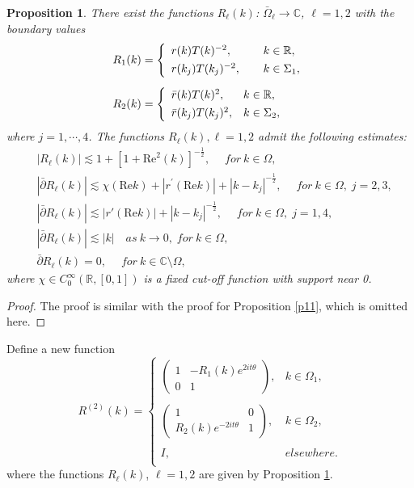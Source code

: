 \documentclass[11pt]{article}
\numberwithin{equation}{section}
\newtheorem{Proposition}{Proposition}
\begin{document}
\begin{Proposition}\label{p22}
There exist  the functions $R_{\ell}(k)$: $\bar{\Omega}_{\ell}\to \mathbb{C}$, $\ell=1,2$  with the boundary values
	\begin{align} &R_{1}(k)=\left\{\begin{array}{ll}
	r(k)T(k)^{-2}, &\hspace{0.4cm}k\in \mathbb{R},\\[4pt]
 r(k_j)T(k_j)^{-2} ,  &\hspace{0.4cm}k\in \Sigma_{1},\\
	\end{array}\right. \\[5pt]
	&R_{2}(k)=\left\{\begin{array}{ll} \bar{r}(k)T(k)^{2},
 &k\in  \mathbb{R},\\[4pt] \bar{r}(k_j)T(k_j)^{2}, &k\in \Sigma_{2},
	\end{array} \right.
	\end{align}	
where $j=1,\cdots, 4$.
The functions  $R_{\ell}(k), \ell=1,2$  admit the following estimates:
	\begin{align*}
    &|R_{\ell}(k)|\lesssim 1+\left[1+\mathrm{Re}^2(k)\right]^{-\frac{1}{2}},\quad\;for\ k \in\Omega,\\
    &|\bar{\partial}R_{\ell}(k)|\lesssim\chi(\mathrm{Re}k)+|r^\prime(\mathrm{Re}k)|+|k-k_j|^{-\frac{1}{2}}, \quad   \;for\  k\in \Omega,\;j=2,3,\\
	&|\bar{\partial}R_{\ell}(k)|\lesssim|r'(\mathrm{Re}k)|+|k-k_j|^{-\frac{1}{2}}, \quad  \;for\   k\in \Omega, \;j=1,4,\\
&|\bar{\partial}R_{\ell}(k)|\lesssim|k| \quad as\ k\to0,\;for\ k\in \Omega,\\
&\bar{\partial}R_{\ell}(k)=0,\quad \;for\ k\in\mathbb{C}\setminus\Omega,\nonumber
	\end{align*}
where $\chi \in C^{\infty}_0(\mathbb{R},[0,1])$ is a fixed cut-off function with support near 0.
\end{Proposition}
\begin{proof}
    The proof is similar with the proof for Proposition \ref{p11}, which is omitted here.
\end{proof}


Define  a new  function
\begin{equation}
R^{(2)}(k)=\left\{\begin{array}{lll}
\left(\begin{array}{cc}
1 & -R_{1}(k)e^{2it\theta}\\
0 & 1
\end{array}\right), & k\in \Omega_{1},\\
\\
\left(\begin{array}{cc}
1 & 0\\
R_{2}(k)e^{-2it\theta} & 1
\end{array}\right),  &k\in \Omega_{2},\\
\\
I,  &elsewhere.\\
\end{array}\right.
\end{equation}
where   the functions $R_{\ell}(k)$, $\ell=1,2$ are given by  Proposition \ref{p22}.
\end{document}
